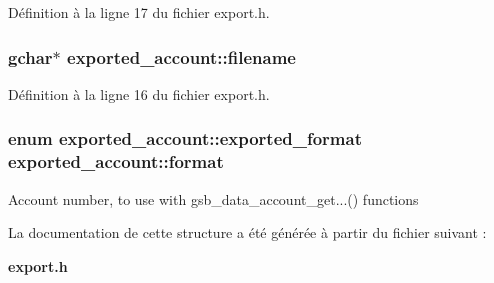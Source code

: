 Définition à la ligne 17 du fichier export.h.

\subsubsection[{filename}]{\setlength{\rightskip}{0pt plus 5cm}gchar$\ast$ {\bf exported\_\-account::filename}}\label{structexported__account_a27b7a0e50f6b9bb0345ddb0ae7d5c701}


Définition à la ligne 16 du fichier export.h.

\subsubsection[{format}]{\setlength{\rightskip}{0pt plus 5cm}enum {\bf exported\_\-account::exported\_\-format}  {\bf exported\_\-account::format}}\label{structexported__account_a77fd0833e50e85469cc0d90e967a7889}
Account number, to use with gsb\_\-data\_\-account\_\-get...() functions 

La documentation de cette structure a été générée à partir du fichier suivant :\begin{DoxyCompactItemize}
\item 
{\bf export.h}\end{DoxyCompactItemize}
